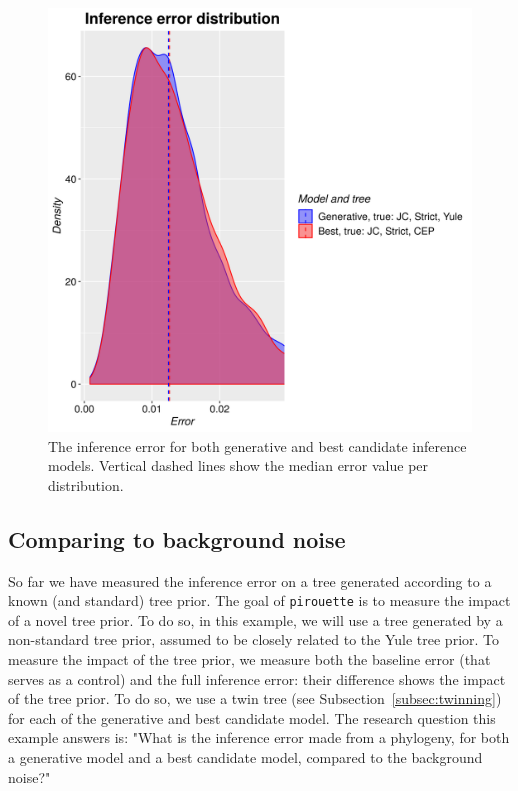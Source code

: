 \begin{figure}[H]
  \includegraphics[width=\textwidth]{example_2/errors.png}
  \caption{
    The inference error for both generative and best candidate inference models.
    Vertical dashed lines show the median error value per distribution.
  }
  \label{fig:example_2}
\end{figure}

\subsection{Comparing to background noise}\label{Comparing to background noise}

So far we have measured the inference error on a tree
generated according to a known (and standard) tree prior. The goal of \verb;pirouette; is to measure the impact of a novel tree prior.
To do so, in this example, we will use a tree generated by a non-standard tree prior, assumed to be closely related to the Yule tree prior.
To measure the impact of the tree prior, we measure both the baseline error (that serves as a control) and the full inference error: their difference shows the impact of the tree prior.
To do so, we use a twin tree (see Subsection~\ref{subsec:twinning}) for each of the generative and best candidate model.
The research question this example answers is:
"What is the inference error made from a phylogeny, for both a generative model and a best candidate model, compared to the background noise?"

